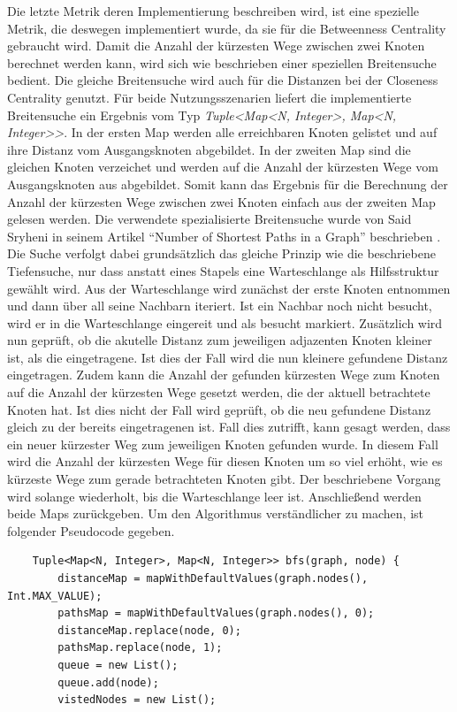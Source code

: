 \documentclass[a4paper,12pt,ngerman,chapterprefix=false,listof=totoc,bibliography=totoc]{scrreprt}
\begin{document}
{{{Die letzte Metrik deren Implementierung beschreiben wird, ist eine spezielle Metrik, die deswegen implementiert wurde, da sie für die Betweenness Centrality gebraucht wird. Damit die Anzahl der kürzesten Wege zwischen zwei Knoten berechnet werden kann, wird sich wie beschrieben einer speziellen Breitensuche bedient. Die gleiche Breitensuche wird auch für die Distanzen bei der Closeness Centrality genutzt. Für beide Nutzungsszenarien liefert die implementierte Breitensuche ein Ergebnis vom Typ \textit{Tuple\textless Map\textless N, Integer\textgreater , Map\textless N, Integer\textgreater\textgreater}. In der ersten Map werden alle erreichbaren Knoten gelistet und auf ihre Distanz vom Ausgangsknoten abgebildet. In der zweiten Map sind die gleichen Knoten verzeichet und werden auf die Anzahl der kürzesten Wege vom Ausgangsknoten aus abgebildet. Somit kann das Ergebnis für die Berechnung der Anzahl der kürzesten Wege zwischen zwei Knoten einfach aus der zweiten Map gelesen werden. Die verwendete spezialisierte Breitensuche wurde von Said Sryheni in seinem Artikel "`Number of Shortest Paths in a Graph"' beschrieben \cite{sryheni_number_2020}. Die Suche verfolgt dabei grundsätzlich das gleiche Prinzip wie die beschriebene Tiefensuche, nur dass anstatt eines Stapels eine Warteschlange als Hilfsstruktur gewählt wird. Aus der Warteschlange wird zunächst der erste Knoten entnommen und dann über all seine Nachbarn iteriert. Ist ein Nachbar noch nicht besucht, wird er in die Warteschlange eingereit und als besucht markiert. Zusätzlich wird nun geprüft, ob die akutelle Distanz zum jeweiligen adjazenten Knoten kleiner ist, als die eingetragene. Ist dies der Fall wird die nun kleinere gefundene Distanz eingetragen. Zudem kann die Anzahl der gefunden kürzesten Wege zum Knoten auf die Anzahl der kürzesten Wege gesetzt werden, die der aktuell betrachtete Knoten hat. Ist dies nicht der Fall wird geprüft, ob die neu gefundene Distanz gleich zu der bereits eingetragenen ist. Fall dies zutrifft, kann gesagt werden, dass ein neuer kürzester Weg zum jeweiligen Knoten gefunden wurde. In diesem Fall wird die Anzahl der kürzesten Wege für diesen Knoten um so viel erhöht, wie es kürzeste Wege zum gerade betrachteten Knoten gibt. Der beschriebene Vorgang wird solange wiederholt, bis die Warteschlange leer ist. Anschließend werden beide Maps zurückgeben. Um den Algorithmus verständlicher zu machen, ist folgender Pseudocode gegeben.
\begin{lstlisting}
	Tuple<Map<N, Integer>, Map<N, Integer>> bfs(graph, node) {
		distanceMap = mapWithDefaultValues(graph.nodes(), Int.MAX_VALUE);
		pathsMap = mapWithDefaultValues(graph.nodes(), 0);
		distanceMap.replace(node, 0);
		pathsMap.replace(node, 1);
		queue = new List();
		queue.add(node);
		vistedNodes = new List();


\end{lstlisting}}}}
\end{document}
